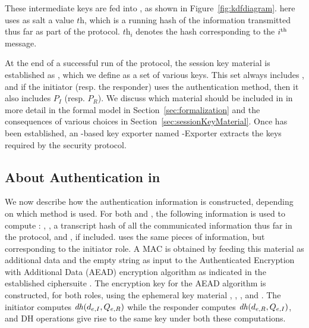 These intermediate keys are fed into \mHkdfExpand{}, as shown in Figure~\ref{fig:kdfdiagram}.
%
\mHkdfExpand{} here uses as salt a value $\textit{th}$, which is a running hash of the information transmitted thus far as part of the protocol.
%
$\textit{th}_{i}$ denotes the hash corresponding to the $i^{\rm{th}}$ message.
%

At the end of a successful run of the protocol, the session key material is
established as \mSessKey{}, which we define as a set of various keys.
%
This set always includes \mGxy{}, and if the initiator (resp. the responder) uses the \mStat{} authentication method, then it also includes $P_{I}$ (resp. $P_{R}$).
%
We discuss which material should be included in \mSessKey{} in more detail in
the formal model in Section~\ref{sec:formalization} and the consequences of
various choices in Section~\ref{sec:sessionKeyMaterial}.
%
Once \mSessKey{} has been established, an \mHkdf{}-based key exporter named
\mEdhoc-Exporter extracts the keys required by the security protocol.
%

\subsection{About Authentication in \mEdhoc{}}
\label{sec:edhocauth}
We now describe how the authentication information is constructed, depending on which method is used.
%
For both \mStat{} and \mSig{}, the following information is used to compute
\mAuthr{}: \mIdcredr{}, \mCredr{}, a transcript hash of all the communicated
information thus far in the protocol, and \mADtwo{}, if included.
%
\mAuthi{} uses the same pieces of information, but corresponding to the
initiator role.
%
A MAC is obtained by feeding this material as additional data and the empty
string as input to the Authenticated Encryption with Additional Data (AEAD)
encryption algorithm as indicated in the established ciphersuite \mSuites{}.
%
The encryption key for the AEAD algorithm is constructed, for both roles,
using the ephemeral key material \mGx{}, \mGy{}, \mX{}, and \mY{}.
%
The initiator computes $\mathit{dh}(d_{e,I}, Q_{e,R})$ while the responder computes
$\mathit{dh}(d_{e,R}, Q_{e,I})$, and DH operations give rise to the same key under both
these computations.
%

